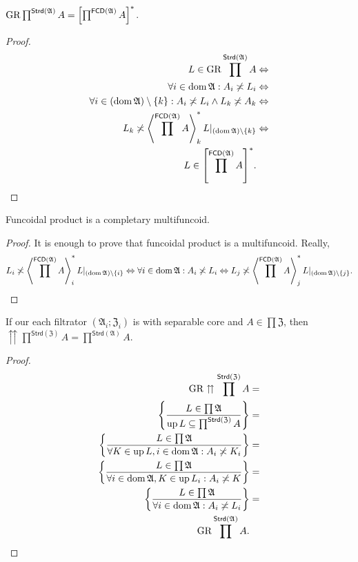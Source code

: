 \begin{prop}
$\operatorname{GR}\prod^{\mathsf{Strd}(\mathfrak{A})}A=\mathord{\mathrel{\left[\prod^{\mathsf{FCD}(\mathfrak{A})}A\right]^{\ast}}}$.\end{prop}
\begin{proof}
~
\begin{align*}
L\in\operatorname{GR}\prod^{\mathsf{Strd}(\mathfrak{A})}A & \Leftrightarrow\\
\forall i\in\operatorname{dom}\mathfrak{A}:A_{i}\not\asymp L_{i} & \Leftrightarrow\\
\forall i\in(\operatorname{dom}\mathfrak{A})\setminus\{k\}:A_{i}\not\asymp L_{i}\land L_{k}\not\asymp A_{k} & \Leftrightarrow\\
L_{k}\not\asymp\left\langle \prod^{\mathsf{FCD}(\mathfrak{A})}A\right\rangle ^{\ast}_{k}L|_{(\operatorname{dom}\mathfrak{A})\setminus\{k\}} & \Leftrightarrow\\
L\in\mathord{\mathrel{\left[\prod^{\mathsf{FCD}(\mathfrak{A})}A\right]^{\ast}}}.
\end{align*}
\end{proof}
\begin{cor}
Funcoidal product is a completary multifuncoid.\end{cor}
\begin{proof}
It is enough to prove that funcoidal product is a multifuncoid. Really,
\[
L_{i}\not\asymp\left\langle \prod^{\mathsf{FCD}(\mathfrak{A})}A\right\rangle ^{\ast}_{i}L|_{(\operatorname{dom}\mathfrak{A})\setminus\{i\}}\Leftrightarrow\forall i\in\operatorname{dom}\mathfrak{A}:A_{i}\not\asymp L_{i}\Leftrightarrow L_{j}\not\asymp\left\langle \prod^{\mathsf{FCD}(\mathfrak{A})}A\right\rangle ^{\ast}_{j}L|_{(\operatorname{dom}\mathfrak{A})\setminus\{j\}}.
\]
\end{proof}
\begin{thm}
If our each filtrator $(\mathfrak{A}_i;\mathfrak{Z}_i)$
is with separable core and $A\in\prod\mathfrak{Z}$, then $\upuparrows\prod^{\mathsf{Strd}(\mathfrak{Z})}A=\prod^{\mathsf{Strd}(\mathfrak{A})}A$.\end{thm}
\begin{proof}
~
\begin{align*}
\operatorname{GR}\upuparrows\prod^{\mathsf{Strd}(\mathfrak{Z})}A & =\\
\left\{ \frac{L\in\prod\mathfrak{A}}{\operatorname{up} L\subseteq\prod^{\mathsf{Strd}(\mathfrak{Z})}A}\right\} & =\\
\left\{ \frac{L\in\prod\mathfrak{A}}{\forall K\in\operatorname{up} L,i\in\operatorname{dom}\mathfrak{A}:A_{i}\not\asymp K_{i}}\right\} & =\\
\left\{ \frac{L\in\prod\mathfrak{A}}{\forall i\in\operatorname{dom}\mathfrak{A},K\in\operatorname{up} L_{i}:A_{i}\not\asymp K}\right\} & =\\
\left\{ \frac{L\in\prod\mathfrak{A}}{\forall i\in\operatorname{dom}\mathfrak{A}:A_{i}\not\asymp L_{i}}\right\} & =\\
\operatorname{GR}\prod^{\mathsf{Strd}(\mathfrak{A})}A.
\end{align*}
\end{proof}
